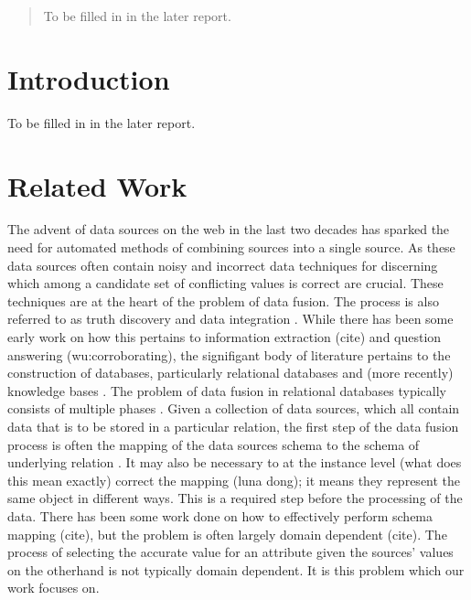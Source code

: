 \documentclass{acm_proc_article-sp}
\begin{document}
\maketitle
\begin{abstract}
To be filled in in the later report. 
\end{abstract}




\section{Introduction}
To be filled in in the later report.


\section{Related Work}
The advent of data sources on the web in the last two decades has sparked the need for automated methods of combining sources into a single source. As these data sources often contain noisy and incorrect data techniques for discerning which among a candidate set of conflicting values is correct are crucial. These techniques are at the heart of the problem of data fusion. The process is also referred to as truth discovery \cite{waguih:truth} \cite{yin:truth} and data integration \cite{sarma:data} \cite{zhao:bayesian}. While there has been some early work on how this pertains to information extraction (cite) and question answering (wu:corroborating), the signifigant body of literature pertains to the construction of databases, particularly relational databases and (more recently) knowledge bases \cite{dong:data}. The problem of data fusion in relational databases typically consists of multiple phases \cite{bleiholder:data} \cite{li:truth}. Given a collection of data sources, which all contain data that is to be stored in a particular relation, the first step of the data fusion process is often the mapping of the data sources schema to the schema of underlying relation \cite{bleiholder:data}. It may also be necessary to at the instance level (what does this mean exactly) correct the mapping (luna dong); it means they represent the same object in different ways. This is a required step before the processing of the data. There has been some work done on how to effectively perform schema mapping (cite), but the problem is often largely domain dependent (cite). The process of selecting the accurate value for an attribute given the sources' values on the otherhand is not typically domain dependent. It is this problem which our work focuses on.
\end{document}
